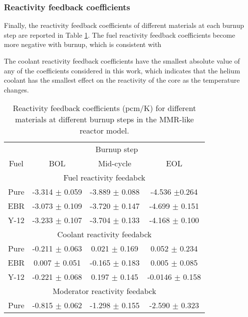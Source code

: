 \subsubsection{Reactivity feedback coefficients}
Finally, the reactivity feedback coefficients of different materials 
at each burnup step are reported in Table \ref{tab:coeff_mmr}. The 
fuel reactivity feedback coefficients become more negative with 
burnup, which is consistent with 

The coolant reactivity feedback coefficients have the smallest absolute 
value of any of the coefficients considered in this work, which 
indicates that the helium coolant has the smallest effect on the reactivity 
of the core as the temperature changes. 

\begin{table}
        \centering 
        \caption{Reactivity feedback coefficients (pcm/K) for different 
        materials at different burnup steps in the \gls{MMR}-like 
        reactor model.}
        \label{tab:coeff_mmr}
        \begin{tabular}{c c c c}
                \hline 
                & \multicolumn{3}{c}{Burnup step} \\
                Fuel & \gls{BOL} & Mid-cycle & \gls{EOL} \\
                \hline 
                \multicolumn{4}{c}{Fuel reactivity feedabck}\\
                Pure & -3.314 $\pm$ 0.059 & -3.889 $\pm$ 0.088 & -4.536 $\pm$0.264\\
                \gls{EBR} & -3.073 $\pm$ 0.109 & -3.720 $\pm$ 0.147 & -4.699 $\pm$ 0.151\\
                Y-12 & -3.233 $\pm$ 0.107 & -3.704 $\pm$ 0.133 & -4.168 $\pm$ 0.100\\
                \hline 
                \multicolumn{4}{c}{Coolant reactivity feedabck}\\
                Pure & -0.211 $\pm$ 0.063 & 0.021 $\pm$ 0.169 & 0.052 $\pm$ 0.234\\
                \gls{EBR} & 0.007 $\pm$ 0.051 & -0.165 $\pm$ 0.183 & 0.005 $\pm$ 0.085\\
                Y-12 & -0.221 $\pm$ 0.068 & 0.197 $\pm$ 0.145 & -0.0146 $\pm$ 0.158\\
                \hline 
                \multicolumn{4}{c}{Moderator reactivity feedabck}\\
                Pure & -0.815 $\pm$ 0.062 & -1.298 $\pm$ 0.155 & -2.590 $\pm$ 0.323\\

\end{tabular}
\end{table}
